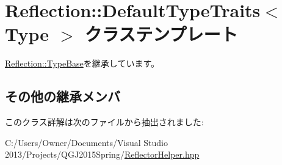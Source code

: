 \hypertarget{class_reflection_1_1_default_type_traits}{}\section{Reflection\+:\+:Default\+Type\+Traits$<$ Type $>$ クラステンプレート}
\label{class_reflection_1_1_default_type_traits}


\hyperlink{class_reflection_1_1_type_base}{Reflection\+::\+Type\+Base}を継承しています。

\subsection*{その他の継承メンバ}


このクラス詳解は次のファイルから抽出されました\+:\begin{DoxyCompactItemize}
\item 
C\+:/\+Users/\+Owner/\+Documents/\+Visual Studio 2013/\+Projects/\+Q\+G\+J2015\+Spring/\hyperlink{_reflector_helper_8hpp}{Reflector\+Helper.\+hpp}\end{DoxyCompactItemize}
